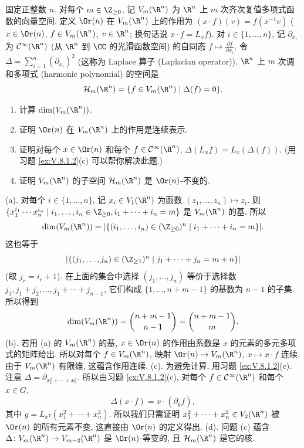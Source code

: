 \begin{exercise}[调和多项式]
\label{ex:V.8.1.1}
固定正整数 $n$. 对每个 $m \in \Z_{\geq 0}$, 记 $V_m(\R^n)$ 为 $\R^n$ 上 $m$ 次齐次复值多项式函数的向量空间. 定义 $\Or(n)$ 在 $V_m(\R^n)$ 上的作用为 $(x \cdot f)(v) = f(x^{-1}v)$ ($x \in \Or(n)$, $f \in V_m(\R^n)$, $v \in \R^n$; 换句话说 $x \cdot f = L_xf$).
对 $i \in \{1, \ldots, n\}$, 记 $\partial_{x_i}$ 为 $\mathcal{C}^{\infty}(\R^n)$ (从 $\R^n$ 到 $\CC$ 的光滑函数空间) 的自同态 $f \longmapsto \frac{\partial f}{\partial x_i}$, 令 $\Delta = \sum_{i=1}^n(\partial_{x_i})^2$ (这称为 Laplace 算子 (Laplacian operator)).
$\R^n$ 上 $m$ 次调和多项式 (harmonic polynomial) 的空间是
\[
\mathcal{H}_m(\R^n) = \{f \in V_m(\R^n) \mid \Delta(f) = 0\}.
\]
\begin{enumerate}
\item[(a)] 计算 $\dim(V_m(\R^n))$.
\item[(b)] 证明 $\Or(n)$ 在 $V_m(\R^n)$ 上的作用是连续表示.
\item[(c)] 证明对每个 $x \in \Or(n)$ 和每个 $f \in \mathcal{C}^{\infty}(\R^n)$, $\Delta(L_xf) = L_x(\Delta(f))$. (用习题 \ref{ex:V.8.1.2}(c) 可以帮你解决此题.)
\item[(d)] 证明 $V_m(\R^n)$ 的子空间 $\mathcal{H}_m(\R^n)$ 是 $\Or(n)$-不变的.
\end{enumerate}
\end{exercise}

\begin{solution}
(a). 对每个 $i \in \{1, \ldots, n\}$, 记 $x_i \in V_1(\R^n)$ 为函数 $(z_1, \ldots, z_n) \longmapsto z_i$. 则 $\{x_1^{i_1}\cdots x_n^{i_n} \mid i_1, \ldots, i_n \in \Z_{\geq 0}, i_1 + \cdots + i_n = m\}$ 是 $V_m(\R^n)$ 的基. 所以
\[
\dim(V_m(\R^n)) = |\{(i_1, \ldots, i_n) \in (\Z_{\geq 0})^n \mid i_1 + \cdots + i_n = m\}|.
\]
这也等于
\[
|\{(j_1, \ldots, j_n) \in (\Z_{\geq 1})^n \mid j_1 + \cdots + j_n = m + n\}|
\]
(取 $j_r = i_r + 1$). 在上面的集合中选择 $(j_1, \ldots, j_n)$ 等价于选择数 $j_1, j_1 + j_2, \ldots, j_1 + \cdots + j_{n-1}$, 它们构成 $\{1, \ldots, n + m - 1\}$ 的基数为 $n - 1$ 的子集. 所以得到
\[
\dim(V_m(\R^n)) = \binom{n + m - 1}{n - 1} = \binom{n + m - 1}{m}.
\]
(b). 若用 (a) 的 $V_m(\R^n)$ 的基, $x \in \Or(n)$ 的作用由系数是 $x$ 的元素的多元多项式的矩阵给出. 所以对每个 $f \in V_m(\R^n)$, 映射 $\Or(n) \to V_m(\R^n)$, $x \longmapsto x \cdot f$ 连续. 由于 $V_m(\R^n)$ 有限维, 这蕴含作用连续.
(c). 为避免计算, 用习题 \ref{ex:V.8.1.2}(c). 注意 $\Delta = \partial_{x_1^2 + \cdots + x_n^2}$. 所以由习题 \ref{ex:V.8.1.2}(c), 对每个 $f \in \mathcal{C}^{\infty}(\R^n)$ 和每个 $x \in G$,
\[
\Delta(x \cdot f) = x \cdot (\partial_g f),
\]
其中 $g = L_{x^T}(x_1^2 + \cdots + x_n^2)$. 所以我们只需证明 $x_1^2 + \cdots + x_n^2 \in V_2(\R^n)$ 被 $\Or(n)$ 的所有元素不变, 这直接由 $\Or(n)$ 的定义得出.
(d). 问题 (c) 蕴含 $\Delta \colon V_m(\R^n) \to V_{m-2}(\R^n)$ 是 $\Or(n)$-等变的, 且 $\mathcal{H}_m(\R^n)$ 是它的核.
\end{solution}

